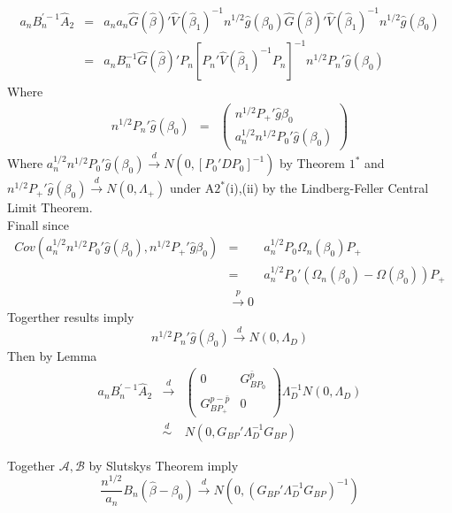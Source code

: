 \documentclass[11pt, fleqn]{article}
\begin{document}
\begin{eqnarray}  a_nB_n^{'-1}\hat{A}_2&=&a_na_n\hat{G}(\hat{\beta})'\hat{V}(\hat{\beta}_1)^{-1}n^{1/2}\hat{g}(\beta_0)\hat{G}(\hat{\beta})'\hat{V}(\hat{\beta}_1)^{-1}n^{1/2}\hat{g}(\beta_0)\\
&=&a_nB_n^{-1}\hat{G}(\hat{\beta})'P_n\left[P_n'\hat{V}(\hat{\beta}_1)^{-1}P_n\right]^{-1}n^{1/2}P_n'\hat{g}(\beta_0)
\end{eqnarray}
Where 
\begin{eqnarray} 
n^{1/2}P_n'\hat{g}(\beta_0)
&=&\left(\begin{array}{c} n^{1/2}P_+'\hat{g}{\beta_0} \\ a_n^{1/2}n^{1/2}P_0'\hat{g}(\beta_0) \end{array} \right) \end{eqnarray}
Where $a_n^{1/2}n^{1/2}P_0'\hat{g}(\beta_0) \overset{d}{\rightarrow} N(0,[P_0'DP_0]^{-1})$ by Theorem $1^*$ and $n^{1/2}P_+'\hat{g}(\beta_0) \overset{d}{\rightarrow} N(0,\Lambda_+)$ under A$2^*$(i),(ii) by the Lindberg-Feller Central Limit Theorem.\\
Finall since
 \begin{eqnarray}
 Cov(a_n^{1/2}n^{1/2}P_0'\hat{g}(\beta_0),n^{1/2}P_+'\hat{g}{\beta_0})&=& a_n^{1/2}P_0\Omega_n(\beta_0)P_+\\
&=& a_n^{1/2}P_0'(\Omega_n(\beta_0)-\Omega(\beta_0))P_+\\
&\overset{p}{\rightarrow} 0
\end{eqnarray}
Togerther results imply
\begin{equation}
n^{1/2}P_n'\hat{g}(\beta_0)\overset{d}{\rightarrow} N(0,\Lambda_D)
\end{equation}
Then by Lemma 
\begin{eqnarray} a_nB_n^{'-1}\hat{A}_2 &\overset{d}{\rightarrow} & \left(\begin{array}{cc} 0 &  G_{BP_0}^{\bar{p}}\\
G_{BP_+}^{p-\bar{p}}& 0
\end{array} \right) \Lambda_D^{-1} N(0,\Lambda_D)\\
&\overset{d}{\sim}& N(0,G_{BP}'\Lambda_D^{-1}G_{BP})
\end{eqnarray}
 
Together $\mathcal{A}, \mathcal{B}$ by Slutskys Theorem imply 
\begin{equation}
\frac{n^{1/2}}{a_n}B_n(\hat{\beta}-\beta_0)\overset{d}{\rightarrow} N(0,(G_{BP}'\Lambda_D^{-1}G_{BP})^{-1})
\end{equation}
\end{document}
